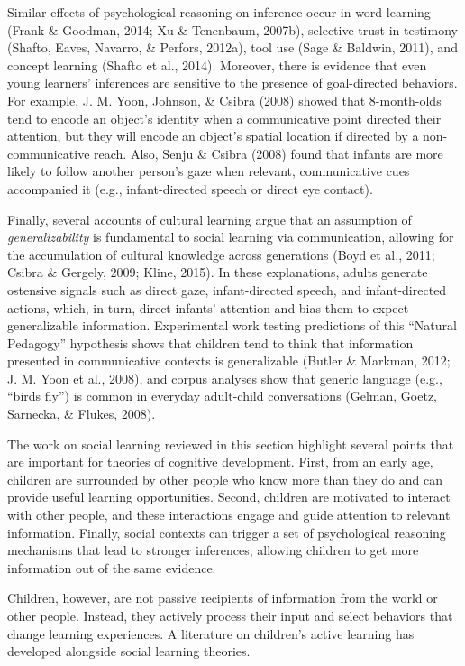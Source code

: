 \documentclass[oneside]{report}
\begin{document}
Similar effects of psychological reasoning on inference occur in word
learning (Frank \& Goodman, 2014; Xu \& Tenenbaum, 2007b), selective
trust in testimony (Shafto, Eaves, Navarro, \& Perfors, 2012a), tool use
(Sage \& Baldwin, 2011), and concept learning (Shafto et al., 2014).
Moreover, there is evidence that even young learners' inferences are
sensitive to the presence of goal-directed behaviors. For example, J. M.
Yoon, Johnson, \& Csibra (2008) showed that 8-month-olds tend to encode
an object's identity when a communicative point directed their
attention, but they will encode an object's spatial location if directed
by a non-communicative reach. Also, Senju \& Csibra (2008) found that
infants are more likely to follow another person's gaze when relevant,
communicative cues accompanied it (e.g., infant-directed speech or
direct eye contact).

Finally, several accounts of cultural learning argue that an assumption
of \emph{generalizability} is fundamental to social learning via
communication, allowing for the accumulation of cultural knowledge
across generations (Boyd et al., 2011; Csibra \& Gergely, 2009; Kline,
2015). In these explanations, adults generate ostensive signals such as
direct gaze, infant-directed speech, and infant-directed actions, which,
in turn, direct infants' attention and bias them to expect generalizable
information. Experimental work testing predictions of this ``Natural
Pedagogy'' hypothesis shows that children tend to think that information
presented in communicative contexts is generalizable (Butler \& Markman,
2012; J. M. Yoon et al., 2008), and corpus analyses show that generic
language (e.g., ``birds fly'') is common in everyday adult-child
conversations (Gelman, Goetz, Sarnecka, \& Flukes, 2008).

The work on social learning reviewed in this section highlight several
points that are important for theories of cognitive development. First,
from an early age, children are surrounded by other people who know more
than they do and can provide useful learning opportunities. Second,
children are motivated to interact with other people, and these
interactions engage and guide attention to relevant information.
Finally, social contexts can trigger a set of psychological reasoning
mechanisms that lead to stronger inferences, allowing children to get
more information out of the same evidence.

Children, however, are not passive recipients of information from the
world or other people. Instead, they actively process their input and
select behaviors that change learning experiences. A literature on
children's active learning has developed alongside social learning
theories.
\end{document}
